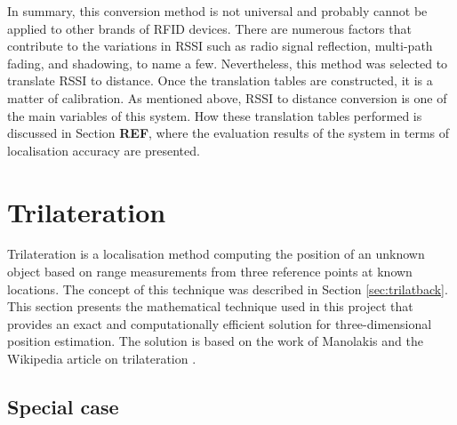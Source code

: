 In summary, this conversion method is not universal and probably cannot be applied to other brands of RFID devices. There are numerous factors that contribute to the variations in RSSI such as radio signal reflection, multi-path fading, and shadowing, to name a few. Nevertheless, this method was selected to translate RSSI to distance. Once the translation tables are constructed, it is a matter of calibration. As mentioned above, RSSI to distance conversion is one of the main variables of this system. How these translation tables performed is discussed in Section \textbf{REF}, where the evaluation results of the system in terms of localisation accuracy are presented.


\section{Trilateration}
\label{sec:trilatmeth}

Trilateration is a localisation method computing the position of an unknown object based on range measurements from three reference points at known locations. The concept of this technique was described in Section \ref{sec:trilatback}. This section presents the mathematical technique used in this project that provides an exact and computationally efficient solution for three-dimensional position estimation. The solution is based on the work of Manolakis \cite{Manolakis1996} and the Wikipedia article on trilateration \cite{Wikipedi2013}.

\subsection{Special case}

